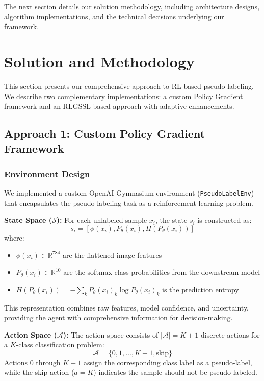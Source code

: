 \documentclass{scrartcl}
\begin{document}
The next section details our solution methodology, including architecture designs, algorithm implementations, and the technical decisions underlying our framework.


\section{Solution and Methodology}

This section presents our comprehensive approach to RL-based pseudo-labeling. We describe two complementary implementations: a custom Policy Gradient framework and an RLGSSL-based approach with adaptive enhancements.

\subsection{Approach 1: Custom Policy Gradient Framework}

\subsubsection{Environment Design}

We implemented a custom OpenAI Gymnasium environment (\texttt{PseudoLabelEnv}) that encapsulates the pseudo-labeling task as a reinforcement learning problem.

\textbf{State Space ($\mathcal{S}$):} For each unlabeled sample $x_i$, the state $s_i$ is constructed as:
\begin{equation}
s_i = [\phi(x_i), P_\theta(x_i), H(P_\theta(x_i))]
\end{equation}
where:
\begin{itemize}
    \item $\phi(x_i) \in \mathbb{R}^{784}$ are the flattened image features
    \item $P_\theta(x_i) \in \mathbb{R}^{10}$ are the softmax class probabilities from the downstream model
    \item $H(P_\theta(x_i)) = -\sum_k P_\theta(x_i)_k \log P_\theta(x_i)_k$ is the prediction entropy
\end{itemize}

This representation combines raw features, model confidence, and uncertainty, providing the agent with comprehensive information for decision-making.

\textbf{Action Space ($\mathcal{A}$):} The action space consists of $|\mathcal{A}| = K + 1$ discrete actions for a $K$-class classification problem:
\begin{equation}
\mathcal{A} = \{0, 1, \ldots, K-1, \text{skip}\}
\end{equation}
Actions $0$ through $K-1$ assign the corresponding class label as a pseudo-label, while the skip action ($a = K$) indicates the sample should not be pseudo-labeled.
\end{document}
